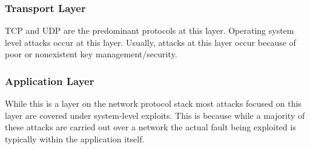 \subsubsection{Transport Layer}
TCP and UDP are the predominant protocols at this layer. Operating system level attacks occur at this layer. Usually, attacks at this layer occur because of poor or nonexistent key management/security.

\subsubsection{Application Layer}
While this is a layer on the network protocol stack most attacks focused on this layer are covered under system-level exploits. This is because while a majority of these attacks are carried out over a network the actual fault being exploited is typically within the application itself.

